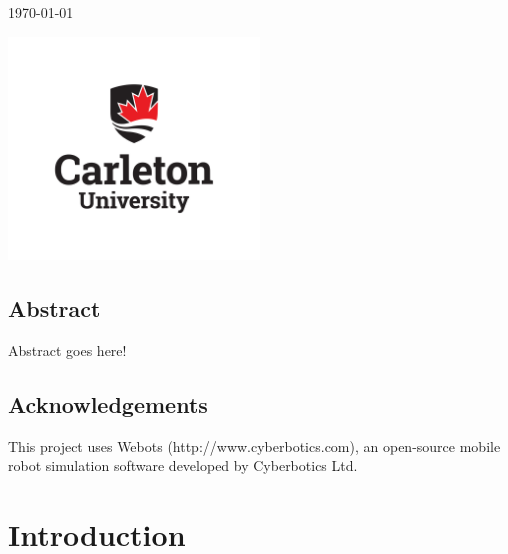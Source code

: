 \begin{titlepage}
	
	\vfill\vfill\vfill %
	
	{\large\today} %
	
	
	\vfill\vfill
	\includegraphics[width=0.5\textwidth]{B_Logo_V-RGBRedBlackonLight150_130821.png}\\[1cm] %
	 
	
	\vfill %
	
\end{titlepage}


\section*{Abstract}
Abstract goes here!

\section*{Acknowledgements}
This project uses Webots (http://www.cyberbotics.com), an open-source mobile robot simulation software developed by Cyberbotics Ltd.

\tableofcontents

\listoffigures

\chapter{Introduction}

